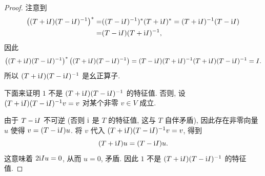 \documentclass{article}
\begin{document}
\begin{proof}
  注意到
  \begin{align*}
    \left( (T+\mathrm{i} I)(T-\mathrm{i} I)^{-1} \right)^* 
    =& ((T-\mathrm{i} I)^{-1})^*(T+\mathrm{i} I)^* 
    = (T+\mathrm{i} I)^{-1}(T-\mathrm{i} I) \\
    =& (T-\mathrm{i} I)(T+\mathrm{i} I)^{-1},
  \end{align*}
  因此
  \[ \left( (T+\mathrm{i} I)(T-\mathrm{i} I)^{-1} \right)^* \left( (T+\mathrm{i} I)(T-\mathrm{i} I)^{-1} \right)
  =(T-\mathrm{i} I)(T+\mathrm{i} I)^{-1}(T+\mathrm{i} I)(T-\mathrm{i} I)^{-1}
  =I. \]
  所以 \( (T+\mathrm{i} I)(T-\mathrm{i} I)^{-1} \) 是幺正算子.\par
  下面来证明 \( 1 \) 不是 \( (T+\mathrm{i} I)(T-\mathrm{i} I)^{-1} \) 的特征值. 否则, 设 \( (T+\mathrm{i} I)(T-\mathrm{i} I)^{-1}v=v \) 对某个非零 \( v\in V \) 成立. \par
  由于 \( T-\mathrm{i} I \) 不可逆 (否则 \( \mathrm{i} \) 是 \( T \) 的特征值, 这与 \( T \) 自伴矛盾), 因此存在非零向量 \( u \) 使得 \( v=(T-\mathrm{i} I)u \). 将 \( v \) 代入 \( (T+\mathrm{i} I)(T-\mathrm{i} I)^{-1}v=v \), 得到
  \[ (T+\mathrm{i} I)u = (T-\mathrm{i} I)u. \]
  这意味着 \( 2\mathrm{i} I u = 0 \), 从而 \( u = 0 \), 矛盾. 因此 \( 1 \) 不是 \( (T+\mathrm{i} I)(T-\mathrm{i} I)^{-1} \) 的特征值.
\end{proof}
\end{document}
